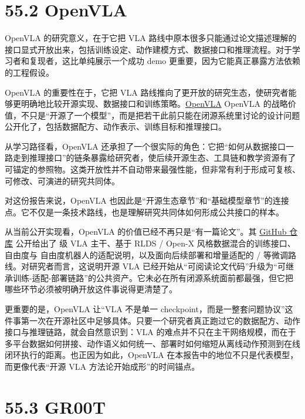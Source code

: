 \section*{55.2 OpenVLA}


OpenVLA 的研究意义，在于它把 VLA 路线中原本很多只能通过论文描述理解的接口显式开放出来，包括训练设定、动作建模方式、数据接口和推理流程。对于学习者和复现者，这比单纯展示一个成功 demo 更重要，因为它能真正暴露方法依赖的工程假设。

OpenVLA 的重要性在于，它把 VLA 路线推向了更开放的研究生态，使研究者能够更明确地比较开源实现、数据接口和训练策略。\href{https://arxiv.org/abs/2406.09246}{OpenVLA} OpenVLA 的战略价值，不只是“开源了一个模型”，而是把若干此前只能在闭源系统里讨论的设计问题公开化了，包括数据配方、动作表示、训练目标和推理接口。

从学习路径看，OpenVLA 还承担了一个很实际的角色：它把“如何从数据接口一路走到推理接口”的链条暴露给研究者，使后续开源生态、工具链和教学资源有了可锚定的参照物。这类开放性并不自动带来最强性能，但非常有利于形成可复核、可修改、可演进的研究共同体。

对这份报告来说，OpenVLA 也因此是“开源生态章节”和“基础模型章节”的连接点。它不仅是一条技术路线，也是理解研究共同体如何形成公共接口的样本。

从当前公开实现看，OpenVLA 的价值已经不再只是“有一篇论文”。其 \href{https://github.com/openvla/openvla}{GitHub 仓库} 公开给出了 \texttt{} 级 VLA 主干、基于 RLDS / Open-X 风格数据混合的训练接口、\texttt{} 自由度与 \texttt{} 自由度机器人的适配说明，以及面向后续部署和增量适配的 \texttt{} / \texttt{} 等微调路线。对研究者而言，这说明开源 VLA 已经开始从“可阅读论文代码”升级为“可继承训练-适配-部署链路”的公共资产。它未必在所有闭源系统面前都最强，但它把哪些环节必须被明确开放这件事说得更清楚了。

更重要的是，OpenVLA 让“VLA 不是单一 checkpoint，而是一整套问题协议”这件事第一次在开源社区中足够具体。只要一个研究者真正跑过它的数据配方、动作接口与推理链路，就会自然意识到：VLA 的难点并不只在主干网络规模，而在于多平台数据如何拼接、动作语义如何统一、部署时如何缩短从离线动作预测到在线闭环执行的距离。也正因为如此，OpenVLA 在本报告中的地位不只是代表模型，而更像代表“开源 VLA 方法论开始成形”的时间锚点。

\section*{55.3 GR00T}


